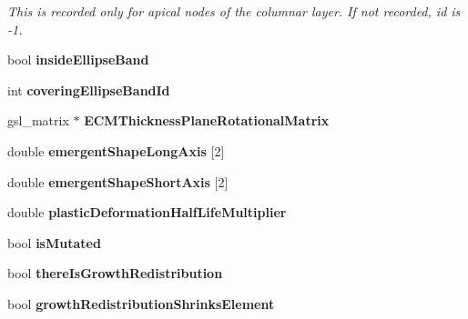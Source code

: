 \begin{DoxyCompactItemize}
\begin{DoxyCompactList}\small\item\em This is recorded only for apical nodes of the columnar layer. If not recorded, id is -\/1. \end{DoxyCompactList}\item 
\hypertarget{classShapeBase_a1571eea2fb8259868afa5814540fe61d}{}bool {\bfseries inside\+Ellipse\+Band}\label{classShapeBase_a1571eea2fb8259868afa5814540fe61d}

\item 
\hypertarget{classShapeBase_a8d2b9ded0e51df7c23499ccc3f4da9fc}{}int {\bfseries covering\+Ellipse\+Band\+Id}\label{classShapeBase_a8d2b9ded0e51df7c23499ccc3f4da9fc}

\item 
\hypertarget{classShapeBase_a10bb522c936642dbc723208544c7d768}{}gsl\+\_\+matrix $\ast$ {\bfseries E\+C\+M\+Thickness\+Plane\+Rotational\+Matrix}\label{classShapeBase_a10bb522c936642dbc723208544c7d768}

\item 
\hypertarget{classShapeBase_a1484f5942bbd147ce0e9e1d842919103}{}double {\bfseries emergent\+Shape\+Long\+Axis} \mbox{[}2\mbox{]}\label{classShapeBase_a1484f5942bbd147ce0e9e1d842919103}

\item 
\hypertarget{classShapeBase_a60c845ab5c6b7e8083faa1a9833765f7}{}double {\bfseries emergent\+Shape\+Short\+Axis} \mbox{[}2\mbox{]}\label{classShapeBase_a60c845ab5c6b7e8083faa1a9833765f7}

\item 
\hypertarget{classShapeBase_a30219b72a2e37fad6ad5dfbcb371a85e}{}double {\bfseries plastic\+Deformation\+Half\+Life\+Multiplier}\label{classShapeBase_a30219b72a2e37fad6ad5dfbcb371a85e}

\item 
\hypertarget{classShapeBase_a3633ac9356d82c0259770ace63ca3d3d}{}bool {\bfseries is\+Mutated}\label{classShapeBase_a3633ac9356d82c0259770ace63ca3d3d}

\item 
\hypertarget{classShapeBase_afb4ab7a9dcb19f182cde416757397b7c}{}bool {\bfseries there\+Is\+Growth\+Redistribution}\label{classShapeBase_afb4ab7a9dcb19f182cde416757397b7c}

\item 
\hypertarget{classShapeBase_a7112715f6a436f2500793f67991b612c}{}bool {\bfseries growth\+Redistribution\+Shrinks\+Element}\label{classShapeBase_a7112715f6a436f2500793f67991b612c}


\end{DoxyCompactItemize}
